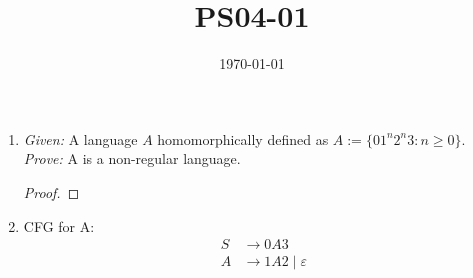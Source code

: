 \documentclass{article}
\title{PS04-01}
\date{\today}
\begin{document}
\maketitle
\begin{enumerate}[label=\alph*.]
	\item \textit{Given: } A language $A$ homomorphically defined as $A := \{01^n2^n3 : n \geq 0\}$.\\
	\textit{Prove: } A is a non-regular language.
	\begin{proof}
	\end{proof}
	\item CFG for A:\\
	\begin{align*}
		S &\rightarrow 0A3\\
		A &\rightarrow 1A2 \mid \varepsilon
	\end{align*}
\end{enumerate}
\end{document}
